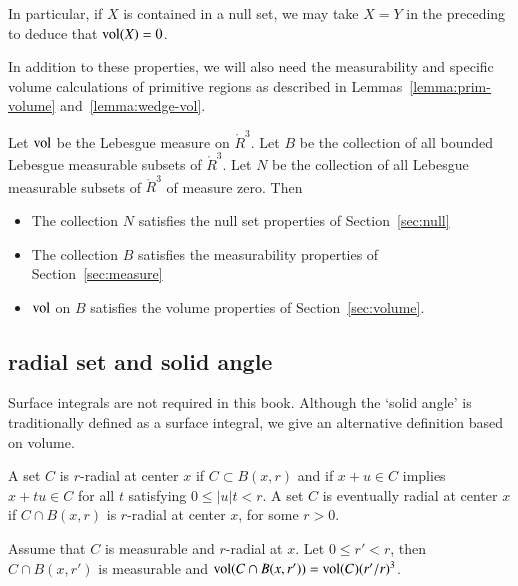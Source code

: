 In particular, if $X$ is contained in a null set, we may take
$X=Y$ in the preceding to deduce that ${\operatorname{vol}}(X)=0$.

In addition to these properties, we will also need the measurability
and specific
volume calculations of primitive regions as described in
Lemmas~\ref{lemma:prim-volume} and~\ref{lemma:wedge-vol}.

\begin{lemma}  Let ${\operatorname{vol}}$ be the Lebesgue measure
on $\ring{R}^3$. Let $B$ be the collection of all bounded Lebesgue
measurable subsets of $\ring{R}^3$.  Let $N$ be the collection of all
Lebesgue measurable subsets of $\ring{R}^3$ of measure zero.
Then
\begin{itemize}
\item  The collection $N$ satisfies the null set properties of Section~\ref{sec:null}
\item The collection $B$ satisfies the measurability properties of Section~\ref{sec:measure}
\item  ${\operatorname{vol}}$ on $B$ satisfies the volume properties of Section~\ref{sec:volume}.  
\end{itemize}
\end{lemma}

\subsection{radial set and solid angle}\label{sec:solid}


Surface integrals are not required in this book.  Although
the `solid angle' is traditionally defined as a surface integral,
we give an alternative definition based on volume.


\begin{definition}[radial]
    A set $C$ is $r$-radial at center $x$ if  $C\subset B(x,r)$
    and if
        $x + u \in C$ implies
        $x + t u \in C$ for all $t$ satisfying $0\le |u| t < r$.
A set $C$ is eventually radial at center $x$ if $C\cap B(x,r)$ is
$r$-radial at center $x$, for some $r>0$.
\end{definition}

\begin{lemma}
Assume that $C$ is measurable and $r$-radial at $x$.  Let $0\le r'<r$,
then $C\cap B(x,r')$ is measurable and
${\operatorname{vol}}(C\cap B(x,r')) = {\operatorname{vol}}(C) (r'/r)^3$.
\end{lemma}

